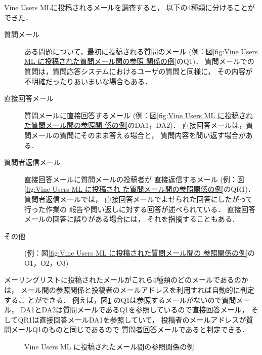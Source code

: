   Vine Users MLに投稿されるメールを調査すると，
  以下の4種類に分けることができた．
\begin{description}
 \item[質問メール] ある問題について，最初に投稿される質問のメール 
	    (例：図\ref{fig:Vine Users ML に投稿された質問メール間の参照
	    関係の例}のQ1)．
	    質問メールでの質問は，質問応答システムにおけるユーザの質問と同様に，
	    その内容が不明確だったりあいまいな場合もある．

 \item[直接回答メール] 質問メールに直接回答するメール
	  (例：図\ref{fig:Vine Users ML に投稿された質問メール間の参照関
	    係の例}のDA1，DA2)．
	    直接回答メールは，質問メールの質問にそのまま答える場合と，
	    質問内容を問い返す場合がある．
  
 \item[質問者返信メール] 直接回答メールに質問メールの投稿者が
	    直接返信するメール (例：図\ref{fig:Vine Users ML に投稿され
	    た質問メール間の参照関係の例}のQR1)．
	    質問者返信メールでは，
	    直接回答メールでよせられた回答にしたがって行った作業の
	    報告や問い返しに対する回答が述べられている．
	    直接回答メールの回答に誤りがある場合には，
	    それを指摘することもある．

 \item[その他] (例：図\ref{fig:Vine Users ML に投稿された質問メール間の
	    参照関係の例}のO1，O2，O3)
\end{description}
メーリングリストに投稿されたメールがこれら4種類のどのメールであるのかは，
メール間の参照関係と投稿者のメールアドレスを利用すれば自動的に判定するこ
とができる．
例えば，図\ref{fig:Vine Users ML に投稿された質問メール間の参照関係の例}
のQ1は参照するメールがないので質問メール，
DA1とDA2は質問メールであるQ1を参照しているので直接回答メール，
そしてQR1は直接回答メールDA1を参照していて，
投稿者のメールアドレスが質問メールQ1のものと同じであるので
質問者回答メールであると判定できる．

\begin{figure}[t]
  \leavevmode
  \begin{center}
    \caption{Vine Users ML に投稿されたメール間の参照関係の例}
    \label{fig:Vine Users ML に投稿された質問メール間の参照関係の例}
  \end{center}
\end{figure}

